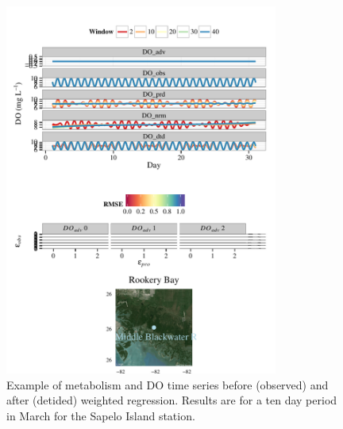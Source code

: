 \documentclass[letterpaper,12pt,oneside]{article}\usepackage[]{graphicx}\usepackage[]{color}
\newenvironment{knitrout}{}{} %
\begin{document}
\begin{knitrout}
\begin{figure}[!ht]
{\centering \includegraphics[width=0.8\textwidth]{figure/case_ex1} 

}

\caption[Example of metabolism and \ac{DO} time series before (observed) and after (detided) weighted regression]{Example of metabolism and \ac{DO} time series before (observed) and after (detided) weighted regression. Results are for a ten day period in March for the Sapelo Island station.\label{fig:case_ex1}}
\end{figure}


\end{knitrout}
\vfill
\clearpage
\end{document}
